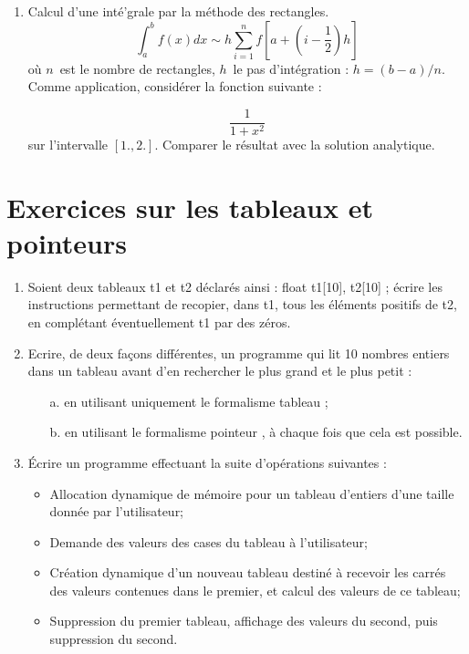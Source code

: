 \documentclass[a4paper, oneside,11pt]{book}
\begin{document}
\begin{enumerate}
\item Calcul d'une int\'e'grale par la m\'ethode des rectangles.
\begin{equation*}
\int_{a}^{b}f\left(x\right)dx\sim h\sum_{i=1}^{n}f\left[a + \left(i-\frac{1}{2}\right)h\right]
\end{equation*}
o\`u $n$\ est le nombre de rectangles, $h$\ le pas d'int\'egration : $h = \left(b-a\right)/n$. Comme application, consid\'erer la fonction suivante : 

\begin{equation*}
\frac{1}{1+x^2}
\end{equation*}
sur l'intervalle $\left[1.,2.\right]$. Comparer le r\'esultat avec la solution analytique.
\end{enumerate}


\section{Exercices sur les tableaux et pointeurs}

\begin{enumerate}
\item Soient deux tableaux t1 et t2 d\'eclar\'es ainsi :
float t1[10], t2[10] ;
\'ecrire les instructions permettant de recopier, dans t1, tous les \'el\'ements positifs de t2, en compl\'etant
\'eventuellement t1 par des z\'eros.
\item Ecrire, de deux façons diff\'erentes, un programme qui lit 10 nombres entiers dans un tableau avant d'en
rechercher le plus grand et le plus petit :
\begin{itemize}
\item[a.] en utilisant uniquement le \og formalisme tableau \fg ;
\item[b.] en utilisant le \og formalisme pointeur \fg, \`a chaque fois que cela est possible.
\end{itemize}
\item Écrire un programme effectuant la suite d’opérations suivantes :
\begin{itemize}
\item Allocation dynamique de mémoire pour un tableau d’entiers d’une taille donnée par l’utilisateur;
\item Demande des valeurs des cases du tableau à l’utilisateur;
\item Création dynamique d’un nouveau tableau destiné à recevoir les carrés des valeurs contenues
dans le premier, et calcul des valeurs de ce tableau;
\item Suppression du premier tableau, affichage des valeurs du second, puis suppression du second.
\end{itemize}
\end{enumerate}
\end{document}
